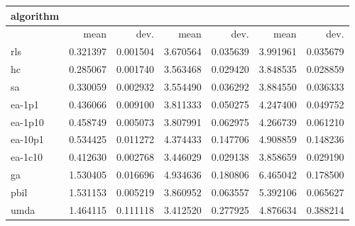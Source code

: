\begin{tabular}{@{}l*{6}{>{{}}N{1}{2}}@{}}
\toprule
{algorithm} &  &  &  \\
\midrule
& {mean} & {dev.} & {mean} & {dev.} & {mean} & {dev.} \\
\midrule
rls & 0.321397 & 0.001504 & 3.670564 & 0.035639 & 3.991961 & 0.035679 \\
 hc & 0.285067 & 0.001740 & 3.563468 & 0.029420 & 3.848535 & 0.028859 \\
 sa & 0.330059 & 0.002932 & 3.554490 & 0.036292 & 3.884550 & 0.036333 \\
 ea-1p1 & 0.436066 & 0.009100 & 3.811333 & 0.050275 & 4.247400 & 0.049752 \\
 ea-1p10 & 0.458749 & 0.005073 & 3.807991 & 0.062975 & 4.266739 & 0.061210 \\
 ea-10p1 & 0.534425 & 0.011272 & 4.374433 & 0.147706 & 4.908859 & 0.148236 \\
 ea-1c10 & 0.412630 & 0.002768 & 3.446029 & 0.029138 & 3.858659 & 0.029190 \\
 ga & 1.530405 & 0.016696 & 4.934636 & 0.180806 & 6.465042 & 0.178500 \\
 pbil & 1.531153 & 0.005219 & 3.860952 & 0.063557 & 5.392106 & 0.065627 \\
 umda & 1.464115 & 0.111118 & 3.412520 & 0.277925 & 4.876634 & 0.388214 \\
 \bottomrule
\end{tabular}
